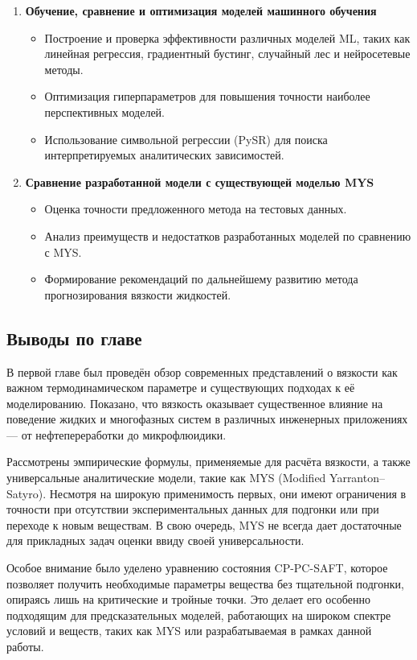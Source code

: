 \documentclass[a4paper,12pt]{article}
\begin{document}
\begin{enumerate}
        \item \textbf{Обучение, сравнение и оптимизация моделей машинного обучения}
        \begin{itemize}
            \item Построение и проверка эффективности различных моделей ML, таких как линейная регрессия, градиентный бустинг, случайный лес и нейросетевые методы.
            \item Оптимизация гиперпараметров для повышения точности наиболее перспективных моделей.
            \item Использование символьной регрессии (PySR) для поиска интерпретируемых аналитических зависимостей.
        \end{itemize}
    
        \item \textbf{Сравнение разработанной модели с существующей моделью MYS}
        \begin{itemize}
            \item Оценка точности предложенного метода на тестовых данных.
            \item Анализ преимуществ и недостатков разработанных моделей по сравнению с MYS.
            \item Формирование рекомендаций по дальнейшему развитию метода прогнозирования вязкости жидкостей.
        \end{itemize}
    \end{enumerate}
  
  \subsection{Выводы по главе}
В первой главе был проведён обзор современных представлений о вязкости как важном термодинамическом параметре и существующих подходах к её моделированию. Показано, что вязкость оказывает существенное влияние на поведение жидких и многофазных систем в различных инженерных приложениях — от нефтепереработки до микрофлюидики.

Рассмотрены эмпирические формулы, применяемые для расчёта вязкости, а также универсальные аналитические модели, такие как MYS (Modified Yarranton–Satyro). Несмотря на широкую применимость первых, они имеют ограничения в точности при отсутствии экспериментальных данных для подгонки или при переходе к новым веществам. В свою очередь, MYS не всегда дает достаточные для прикладных задач оценки ввиду своей универсальности.  

Особое внимание было уделено уравнению состояния CP-PC-SAFT, которое позволяет получить необходимые параметры вещества без тщательной подгонки, опираясь лишь на критические и тройные точки. Это делает его особенно подходящим для предсказательных моделей, работающих на широком спектре условий и веществ, таких как MYS или разрабатываемая в рамках данной работы.
\end{document}
